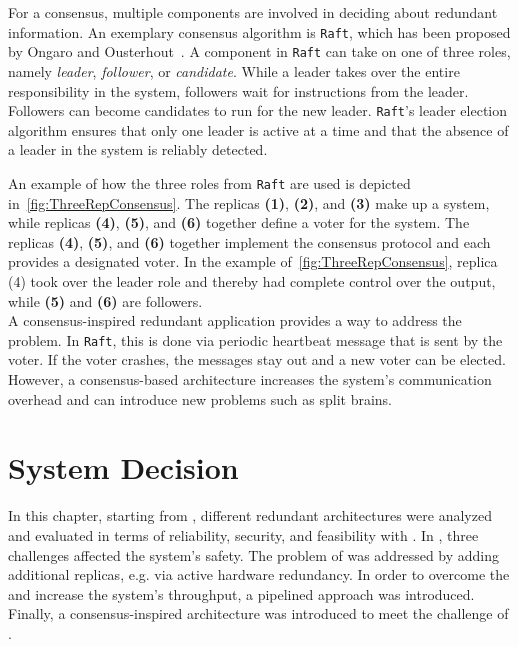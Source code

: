 For a consensus, multiple components are involved in deciding about redundant information.
An exemplary consensus algorithm is \texttt{Raft}, which has been proposed by Ongaro and Ousterhout~\cite{RaftConsensusPaper}.
A component in \texttt{Raft} can take on one of three roles, namely \textit{leader}, \textit{follower}, or \textit{candidate}.
While a leader takes over the entire responsibility in the system, followers wait for instructions from the leader.
Followers can become candidates to run for the new leader.
\texttt{Raft}'s leader election algorithm ensures that only one leader is active at a time and that the absence of a leader in the system is reliably detected.

An example of how the three roles from \texttt{Raft} are used is depicted in~\autoref{fig:ThreeRepConsensus}.
The replicas \textbf{(1)}, \textbf{(2)}, and \textbf{(3)} make up a  system, while replicas \textbf{(4)}, \textbf{(5)}, and \textbf{(6)} together define a voter for the system.
The replicas \textbf{(4)}, \textbf{(5)}, and \textbf{(6)} together implement the consensus protocol and each provides a designated voter.
In the example of~\autoref{fig:ThreeRepConsensus}, replica (4) took over the leader role and thereby had complete control over the output, while \textbf{(5)} and \textbf{(6)} are followers.
\\

\noindent
A consensus-inspired redundant application provides a way to address the \ChallengeVoter problem.
In \texttt{Raft}, this is done via periodic heartbeat message that is sent by the voter.
If the voter crashes, the messages stay out and a new voter can be elected.
However, a consensus-based architecture increases the system's communication overhead and can introduce new problems such as split brains.


\section{System Decision}
In this chapter, starting from , different redundant architectures were analyzed and evaluated in terms of reliability, security, and feasibility with .
In , three challenges affected the system's safety.
The problem of \ChallengeWR was addressed by adding additional replicas, e.g. via active hardware redundancy.
In order to overcome the \ChallengeThrough and increase the system's throughput, a pipelined approach was introduced.
Finally, a consensus-inspired architecture was introduced to meet the challenge of \ChallengeVoter.
\\

